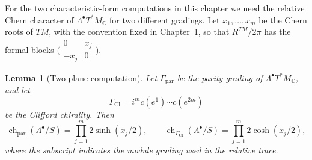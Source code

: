 \documentclass[11pt,oneside,reqno]{book}
\DeclareMathOperator{\Cl}{Cl}
\newcommand{\C}{\mathbb C}
\theoremstyle{plain}
\newtheorem{lemma}[theorem]{Lemma}
\theoremstyle{definition}
\theoremstyle{remark}
\begin{document}
For the two characteristic-form computations in this chapter we need the
relative Chern character of \(\Lambda^\bullet T^*M_\C\) for two different
gradings.  Let \(x_1,\ldots,x_m\) be the Chern roots of \(TM\), with the
convention fixed in Chapter~1, so that \(R^{TM}/2\pi\) has the formal
blocks \(\bigl(\begin{smallmatrix}0&x_j\\-x_j&0\end{smallmatrix}\bigr)\).

\begin{lemma}[Two-plane computation]\label{lem:two-plane}
Let \(\Gamma_{\mathrm{par}}\) be the parity grading of
\(\Lambda^\bullet T^*M_\C\), and let
\[
 \Gamma_{\Cl}=i^mc(e^1)\cdots c(e^{2m})
\]
be the Clifford chirality.  Then
\[
 \operatorname{ch}_{\mathrm{par}}(\Lambda^\bullet/S)
 =\prod_{j=1}^m2\sinh(x_j/2),
 \qquad
 \operatorname{ch}_{\Gamma_{\Cl}}(\Lambda^\bullet/S)
 =\prod_{j=1}^m2\cosh(x_j/2),
\]
where the subscript indicates the module grading used in the relative
trace.
\end{lemma}
\end{document}
